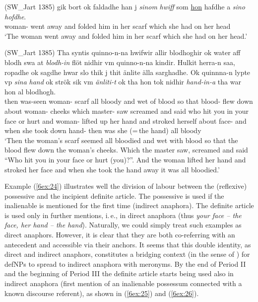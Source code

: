 \documentclass[output=paper]{langsci/langscibook}
\begin{document}
\begin{exe}
\begin{samepage}
\ex\label{6ex:23}
(SW\_Jart 1385)
\exi{}
 gik bort ok faldadhe han j {\emph{sinom}} {\emph{hwiff}} som {\ul{hon}} hafdhe a {\emph{sino}} {\emph{hofdhe}}. \\
woman-{} went away and folded him in her scarf which she had on her head \\
\glt `The woman went away and folded him in her scarf which she had on her head.'
\end{samepage}
\begin{samepage}
\ex\label{6ex:24}
(SW\_Jart 1385)
\exi{}
\gll Tha syntis quinno-n-na hwifwir allir blodhoghir ok water aff blodh swa at {\emph{blodh-in}} flöt nidhir vm quinno-n-na kindir. Hulkit herra-n saa, ropadhe ok sagdhe hwar slo thik j thit änlite älla sarghadhe. Ok quinnna-n lypte vp {\emph{sina}} {\emph{hand}} ok strök sik vm {\emph{änliti-t}} ok tha hon tok nidhir {\emph{hand-in-a}} tha war hon al blodhogh. \\
%
then was-seen woman-{} scarf all bloody and wet of blood so that blood-{} flew down about woman-{} cheeks which master-{} saw screamed and said who hit you in your face or hurt and woman-{} lifted up her hand and stroked herself about face-{} and when she took down hand-{} then was {she (=\,the hand)} all bloody \\
\glt 
{`Then the woman's scarf seemed all bloodied and wet with blood so that the blood flew down the woman's cheeks. Which the master saw, screamed and said ``Who hit you in your face or hurt (you)?''. And the woman lifted her hand and stroked her face and when she took the hand away it was all bloodied.'}
\end{samepage}
\end{exe}

Example (\ref{6ex:24}) illustrates well the division of labour between the (reflexive) possessive and the incipient definite article. The possessive is used if the inalienable is mentioned for the first time (indirect anaphora). The definite article is used only in further mentions, i.\,e., in direct anaphora (thus {\emph{your face -- the face, her hand -- the hand}}). Naturally, we could simply treat such examples as direct anaphors. However, it is clear that they are both co-referring with an antecedent and accessible via their anchors. It seems that this double identity, as direct and indirect anaphors, constitutes a bridging context (in the sense of \citealt{heine:02}) for defNPs to spread to indirect anaphora with meronyms. By the end of Period II and the beginning of Period III the definite article starts being used also in indirect anaphora (first mention of an inalienable possessum connected with a known discourse referent), as shown in (\ref{6ex:25}) and (\ref{6ex:26}).
\end{document}
